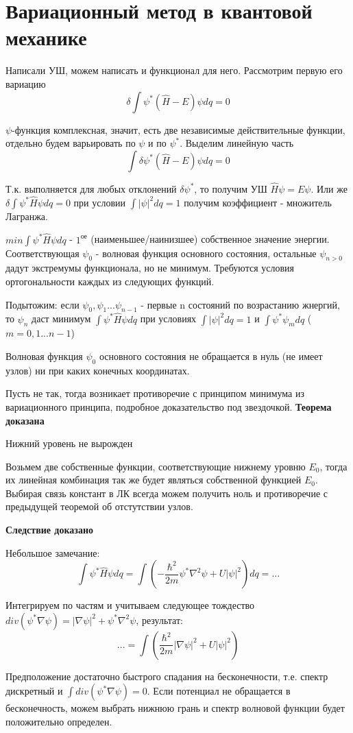 \newpage
\chapter{Вариационный метод в квантовой механике}
\par Написали УШ, можем написать и функционал для него. Рассмотрим первую его вариацию
$$\delta \int \psi^* (\hat{H} - E)\psi dq = 0$$
\par $\psi$-функция комплексная, значит, есть две независимые действительные функции, отдельно будем варьировать по $\psi$ и по $\psi^*$. Выделим линейную часть
$$ \int \delta \psi^* (\hat{H} - E)\psi dq = 0 $$
\par Т.к. выполняется для любых отклонений $\delta \psi^*$, то получим УШ $\hat{H}\psi= E\psi$. Или же $\delta \int \psi^* \hat{H} \psi dq = 0$ при условии $\int |\psi|^2 dq = 1$ получим коэффициент - множитель Лагранжа.
\par $min \int \psi^* \hat{H} \psi dq$ - $1^{ое}$ (наименьшее/наинизшее) собственное значение энергии. Соответствующая $\psi_0$ - волновая функция основного состояния, остальные $\psi_{n>0}$ дадут экстремумы функционала, но не минимум. Требуются условия ортогональности каждых из следующих функций.
\par Подытожим: если $\psi_0, \psi_1...\psi_{n-1}$ - первые n состояний по возрастанию жнергий, то $\psi_n$ даст минимум $\int \psi^* \hat{H} \psi dq$ при условиях $\int |\psi|^2 dq = 1$ и $\int \psi^* \psi_m dq$ ($m=0,1...n-1$)
\begin{theorem} Волновая функция $\psi_0$ основного состояния не обращается в нуль (не имеет узлов) ни при каких конечных координатах.
\par
\proof Пусть не так, тогда возникает противоречие с принципом минимума из вариационного принципа, подробное доказательство под звездочкой.
\textbf{Теорема доказана}
\end{theorem}
\begin{corollary} Нижний уровень не вырожден
\par
\proof Возьмем две собственные функции, соответствующие нижнему уровню $E_0$, тогда их линейная комбинация так же будет являться собственной функцией $E_0$. Выбирая связь констант в ЛК всегда можем получить ноль и противоречие с предыдущей теоремой об отстутствии узлов.
\end{corollary}
\textbf{Следствие доказано}
\par Небольшое замечание:
$$\int \psi^* \hat{H} \psi dq = \int (-\frac{\hbar^2}{2m} \psi^* \nabla^2 \psi+U|\psi|^2)dq = ...$$
\par Интегрируем по частям и учитываем следующее тождество $div(\psi^* \nabla \psi)= |\nabla\psi|^2 + \psi^* \nabla^2 \psi$, результат:
$$...= \int \left(\frac{\hbar^2}{2m} |\nabla\psi|^2 + U |\psi|^2 \right)$$
\par Предположение достаточно быстрого спадания на бесконечности, т.е. спектр дискретный и $\int div(\psi^* \nabla \psi) = 0$. Если потенциал не обращается в бесконечность, можем выбрать нижнюю грань и спектр волновой функции будет положительно определен.
